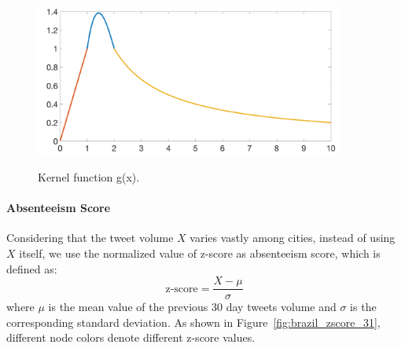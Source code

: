 \begin{figure}[t]
	\centering
    {
		\includegraphics[width= 4in] {figures/kernel_function.png}
		\label{fig:kernel_function}
	}
	\caption{Kernel function g(x).}
	\label{fig:kernel_function}
\end{figure}


\paragraph{Absenteeism Score}
Considering that
the tweet volume $X$ varies vastly among cities, instead of using $X$ itself, we use the normalized value of z-score as absenteeism score, which is defined as:
\begin{equation}
\label{eq:Z_score}
\textrm{z-score} = \frac{X-\mu}{\sigma}
\end{equation}where $\mu$ is the mean value of the previous $30$ day tweets volume and $\sigma$ is the corresponding standard deviation. As shown in Figure~\ref{fig:brazil_zscore_31}, different
node colors denote different z-score values.



